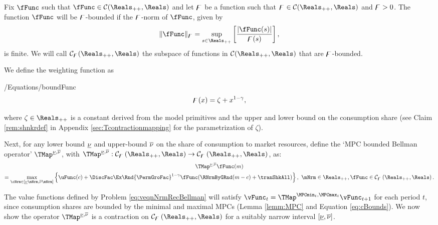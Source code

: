 \documentclass[BufferStockTheory]{subfiles}
\begin{document}
\begin{definition}
  Fix $\fFunc$ such that $\fFunc \in \mathcal{C}(\Reals_{++},\Reals)$ and let $\digamma$ be a function such that $\boundFunc\in \mathcal{C}(\Reals_{++},\Reals)$ and $\digamma >0$. The function $\fFunc$ will be $\digamma$-bounded if the $\digamma$-norm of $\fFunc$, given by
  \begin{equation}
    \Vert \fFunc\Vert _{\boundFunc }=\sup_{s\in \Reals_{++}}\left[ \frac{|\fFunc(s)|}{\boundFunc (s)}\right],
    \label{eq:phinorm}
  \end{equation}%
  is finite.
We will call $\mathcal{C}_{\boundFunc}(\Reals_{++},\Reals)$ the subspace of functions in $\mathcal{C}(\Reals_{++},\Reals)$ that are $\digamma$-bounded.
\end{definition}

We define the weighting function as
%
\begin{verbatimwrite}{\econtexRoot/Equations/boundFunc}
\begin{equation}
\digamma(x) = \zeta + x^{1-\gamma},
\end{equation}
\end{verbatimwrite} \unskip

where $\zeta \in \Reals_{++}$ is a constant derived from the model primitives and the upper and lower bound on the consumption share (see Claim \ref{rem:shnkrdef} in Appendix \ref{sec:Tcontractionmapping} for the parametrization of $\zeta$).
  
Next, for any lower bound $\underline{\nu}$ and upper-bound $\overline{\nu}$ on the share of consumption to market resources, define the `MPC bounded Bellman operator' $\TMap^{\MPCminInf, \MPCmaxInf}$, with \textit{$\TMap^{\MPCminInf, \MPCmaxInf}:\mathcal{C}_{\boundFunc }\left( \Reals_{++},\Reals\right) \rightarrow \mathcal{C}_{\boundFunc }\left( \Reals_{++},\Reals\right) $}, as:
%
\begin{multline}
\TMap^{\MPCminInf, \MPCmaxInf} \fFunc(m) \\  = \max_{\cNrm \in
    [\MPCminInf \mNrm, \MPCmaxInf \mNrm]
  }  \left\{\uFunc(c) + \DiscFac\Ex\Rnd{\PermGroFac}^{1-\CRRA}\fFunc(\RNrmByGRnd(m - c) + \tranShkAll)\right\}, \,\,  \mNrm\in \Reals_{++}, \fFunc\in \mathcal{C}_{\boundFunc }\left(\Reals_{++},\Reals\right).
\end{multline}

The value functions defined by Problem \eqref{eq:veqnNrmRecBellman} will satisfy  $\vFunc_{t} = \TMap^{\MPCmin_{t}, \MPCmax_{t}}\vFunc_{t+1}$ for each period $t$, since consumption shares are bounded by the minimal and maximal MPCs (Lemma \ref{lemm:MPC} and Equation \eqref{eq:cBounds}).
We now show the operator $\TMap^{\MPCminInf, \MPCmaxInf}$ is a contraction on $\mathcal{C}_{\boundFunc }\left( \Reals_{++},\Reals\right)$ for a suitably narrow interval $[\underline{\nu}, \overline{\nu}]$.
\end{document}
